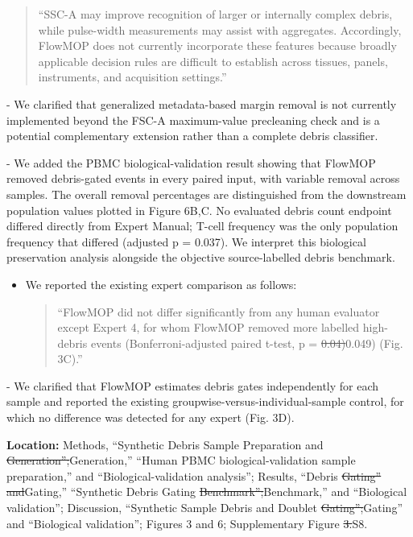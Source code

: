 \documentclass[
  11pt,
  a4paper,
]{article}
\begin{document}
\begin{itemize}
  \begin{quote}
  ``SSC-A may improve recognition of larger or internally complex
  debris, while pulse-width measurements may assist with aggregates.
  Accordingly, FlowMOP does not currently incorporate these features
  because broadly applicable decision rules are difficult to establish
  across tissues, panels, instruments, and acquisition settings.''
  \end{quote}
\end{itemize}

{\color{revisionblue}- We clarified that generalized metadata-based
margin removal is not currently implemented beyond the FSC-A
maximum-value precleaning check and is a potential complementary
extension rather than a complete debris classifier.}

{\color{revisionblue}- We added the PBMC biological-validation result
showing that FlowMOP removed debris-gated events in every paired input,
with variable removal across samples. The overall removal percentages
are distinguished from the downstream population values plotted in
Figure 6B,C. No evaluated debris count endpoint differed directly from
Expert Manual; T-cell frequency was the only population frequency that
differed (adjusted p = 0.037). We interpret this biological preservation
analysis alongside the objective source-labelled debris benchmark.}

\begin{itemize}
\item
  We reported the existing expert comparison as follows:

  \begin{quote}
  ``FlowMOP did not differ significantly from any human evaluator except
  Expert 4, for whom FlowMOP removed more labelled high-debris events
  (Bonferroni-adjusted paired t-test, p =
  {\color{revisionred}\sout{0.04)}}{\color{revisionblue}0.049)} (Fig.
  3C).''
  \end{quote}
\end{itemize}

{\color{revisionblue}- We clarified that FlowMOP estimates debris gates
independently for each sample and reported the existing
groupwise-versus-individual-sample control, for which no difference was
detected for any expert (Fig. 3D).}

\textbf{Location:} Methods, ``Synthetic Debris Sample Preparation and
{\color{revisionred}\sout{Generation'';}}{\color{revisionblue}Generation,''
``Human PBMC biological-validation sample preparation,'' and
``Biological-validation analysis'';} Results, ``Debris
{\color{revisionred}\sout{Gating'' and}}{\color{revisionblue}Gating,''}
``Synthetic Debris Gating
{\color{revisionred}\sout{Benchmark'';}}{\color{revisionblue}Benchmark,''
and ``Biological validation'';} Discussion, ``Synthetic Sample Debris
and Doublet
{\color{revisionred}\sout{Gating'';}}{\color{revisionblue}Gating'' and
``Biological validation''; Figures 3 and 6; Supplementary} Figure
{\color{revisionred}\sout{3.}}{\color{revisionblue}S8.}
\end{document}
